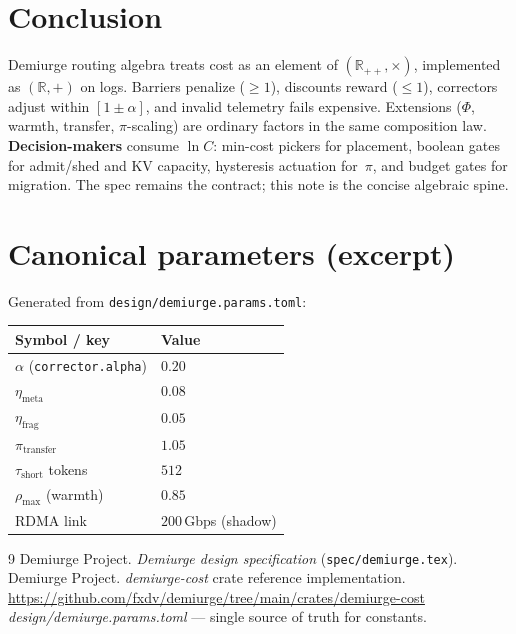 \documentclass[11pt,a4paper]{article}
\begin{document}
\section{Conclusion}

Demiurge routing algebra treats cost as an element of
$(\mathbb{R}_{++}, \times)$, implemented as $(\mathbb{R}, +)$ on logs.
Barriers penalize ($\ge 1$), discounts reward ($\le 1$), correctors adjust
within $[1\!\pm\!\alpha]$, and invalid telemetry fails expensive.
Extensions ($\Phi$, warmth, transfer, $\pi$-scaling) are ordinary factors in
the same composition law.
\textbf{Decision-makers} consume $\ln C$: min-cost pickers for placement,
boolean gates for admit/shed and KV capacity, hysteresis actuation for~$\pi$,
and budget gates for migration.
The spec remains the contract; this note is the concise algebraic spine.

\appendix

\section{Canonical parameters (excerpt)}

Generated from \texttt{design/demiurge.params.toml}:

\begin{center}
\begin{tabular}{@{}ll@{}}
  \toprule
  Symbol / key & Value \\
  \midrule
  $\alpha$ (\texttt{corrector.alpha}) & $0.20$ \\
  $\eta_{\mathrm{meta}}$ & $0.08$ \\
  $\eta_{\mathrm{frag}}$ & $0.05$ \\
  $\pi_{\mathrm{transfer}}$ & $1.05$ \\
  $\tau_{\mathrm{short}}$ tokens & $512$ \\
  $\rho_{\max}$ (warmth) & $0.85$ \\
  RDMA link & $200$\,Gbps (shadow) \\
  \bottomrule
\end{tabular}
\end{center}


\begin{thebibliography}{9}
Demiurge Project.
\textit{Demiurge design specification} (\texttt{spec/demiurge.tex}).
Demiurge Project.
\textit{demiurge-cost} crate reference implementation.
\url{https://github.com/fxdv/demiurge/tree/main/crates/demiurge-cost}
\textit{design/demiurge.params.toml} --- single source of truth for constants.
\end{thebibliography}
\end{document}
